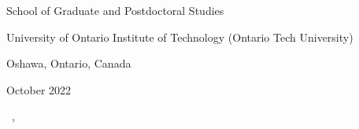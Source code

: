 \begin{titlepage}
\begin{center}
School of Graduate and Postdoctoral Studies 

\medskip

University of Ontario Institute of Technology (Ontario Tech University)

\medskip

Oshawa, Ontario, Canada

\medskip
October 2022

\vfill


\bigskip
\textcopyright{} \makeatletter \@firstname\ {\@lastname}\makeatother, \degreeyear



\vspace*{2\bigskipamount}

\end{center}

\end{titlepage}
